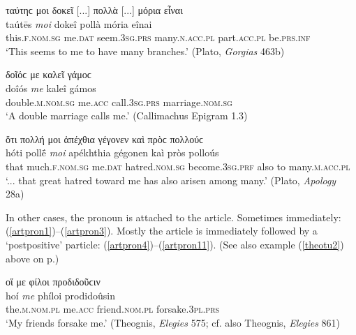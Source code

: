 \begin{exe}
\ex ταύτηϲ μοι δοκεῖ {[}...{]} πολλὰ {[}...{]} μόρια εἶναι\\
\gll taútēs \emph{moi} dokeî pollà mória eînai\\
this.\textsc{f.nom.sg} me.\textsc{dat} seem.\textsc{3sg.prs}
many.\textsc{n.acc.pl} part.\textsc{acc.pl} be.\textsc{prs.inf}\\
\trans `This seems to me to have many branches.' (Plato, \textit{Gorgias} 463b)
\label{pronverb2}
\end{exe}

\begin{exe}
\ex δοῖόϲ με καλεῖ γάμοϲ\\
\gll doîós \emph{me} kaleî gámos\\
double.\textsc{m.nom.sg} me.\textsc{acc} call.\textsc{3sg.prs} marriage.\textsc{nom.sg}\\
\trans `A double marriage calls me.' (Callimachus Epigram 1.3)
\label{pronverb3}
\end{exe}

\begin{exe}
\ex ὅτι πολλή μοι ἀπέχθια γέγονεν καὶ πρὸϲ πολλούϲ\\
\gll hóti pollḗ \emph{moi} apékhthia gégonen kaì pròs polloús\\
that much.\textsc{f.nom.sg} me.\textsc{dat} hatred.\textsc{nom.sg}
become.\textsc{3sg.prf} also to many.\textsc{m.acc.pl}\\
\trans `... that great hatred toward me has also arisen among many.' (Plato, \textit{Apology} 28a)
\label{PlatApol28a}
\end{exe}

In other cases, the pronoun is attached to the article. Sometimes immediately: (\ref{artpron1})--(\ref{artpron3}). Mostly the article is immediately followed by a `postpositive' particle: (\ref{artpron4})--(\ref{artpron11}). (See also example (\ref{theotu2}) above on p\pageref{theotu2}.)

\begin{exe}
\ex οἵ με φίλοι προδιδοῦϲιν\\
\gll hoí \emph{me} phíloi prodidoûsin\\
the.\textsc{m.nom.pl} me.\textsc{acc} friend.\textsc{nom.pl}
forsake.\textsc{3pl.prs}\\
\trans `My friends forsake me.' (Theognis, \textit{Elegies} 575; cf. also Theognis, \textit{Elegies} 861)
\label{artpron1}
\end{exe}

